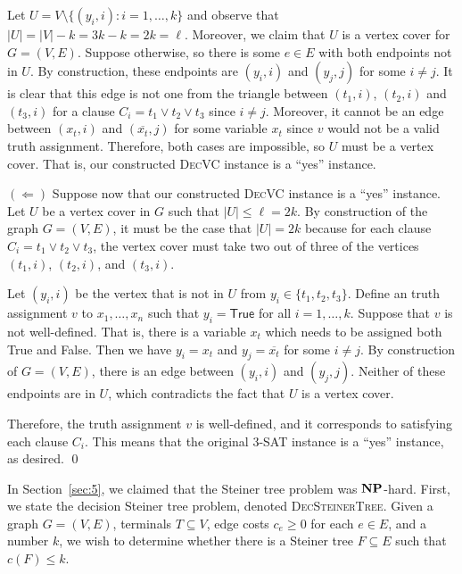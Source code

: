 \begin{pf}
    Let $U = V \setminus \{(y_i, i) : i = 1, \dots, k\}$ and observe that 
    $|U| = |V| - k = 3k - k = 2k = \ell$. Moreover, we claim that $U$ is a 
    vertex cover for $G = (V, E)$. Suppose otherwise, so there is some $e \in E$ 
    with both endpoints not in $U$. By construction, these endpoints are 
    $(y_i, i)$ and $(y_j, j)$ for some $i \neq j$. It is clear that 
    this edge is not one from the triangle between $(t_1, i)$, $(t_2, i)$
    and $(t_3, i)$ for a clause $C_i = t_1 \vee t_2 \vee t_3$ since $i \neq j$.
    Moreover, it cannot be an edge between $(x_t, i)$ and $(\overline{x_t}, j)$ 
    for some variable $x_t$ since $v$ would not be a valid truth assignment.
    Therefore, both cases are impossible, so $U$ must be a vertex cover. 
    That is, our constructed \textsc{DecVC} instance is a ``yes'' instance.

    $(\Leftarrow)$ Suppose now that our constructed \textsc{DecVC} instance 
    is a ``yes'' instance. Let $U$ be a vertex cover in $G$ such that 
    $|U| \leq \ell = 2k$. By construction of the graph $G = (V, E)$, 
    it must be the case that $|U| = 2k$ because for each clause 
    $C_i = t_1 \vee t_2 \vee t_3$, the vertex cover must take two 
    out of three of the vertices $(t_1, i)$, $(t_2, i)$, and $(t_3, i)$. 

    Let $(y_i, i)$ be the vertex that is not in $U$ from $y_i \in 
    \{t_1, t_2, t_3\}$. Define an truth assignment $v$ to $x_1, \dots, x_n$ 
    such that $y_i = \textsf{True}$ for all $i = 1, \dots, k$. Suppose that 
    $v$ is not well-defined. That is, there is a variable $x_t$ which 
    needs to be assigned both \textsf{True} and \textsf{False}. 
    Then we have $y_i = x_t$ and $y_j = \overline{x_t}$ for some $i \neq j$. 
    By construction of $G = (V, E)$, there is an edge between $(y_i, i)$ 
    and $(y_j, j)$. Neither of these endpoints are in $U$, which 
    contradicts the fact that $U$ is a vertex cover.

    Therefore, the truth assignment $v$ is well-defined, and it corresponds 
    to satisfying each clause $C_i$. This means that the original 
    \textsc{3-SAT} instance is a ``yes'' instance, as desired. \qed 
\end{pf}\vspace{-0.15cm}
In Section~\ref{sec:5}, we claimed that the Steiner tree problem 
was $\mathbf{NP}$-hard. First, we state the 
decision Steiner tree problem, denoted \textsc{DecSteinerTree}. 
Given a graph $G = (V, E)$, terminals $T \subseteq V$, 
edge costs $c_e \geq 0$ for each $e \in E$, and a number $k$,
we wish to determine whether there is a Steiner tree $F \subseteq E$ 
such that $c(F) \leq k$. 


